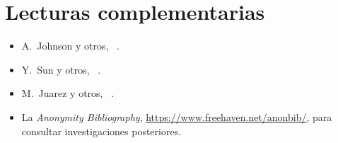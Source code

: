 \section*{Lecturas complementarias}
\begin{itemize}
  \item A.~Johnson y otros, ~\cite{johnson2013users}.
  \item Y.~Sun y otros, ~\cite{sun2015raptor}.
  \item M.~Juarez y otros, ~\cite{juarez2014critical}.
  \item La \emph{Anonymity Bibliography}, \url{https://www.freehaven.net/anonbib/}, para consultar investigaciones posteriores.
\end{itemize}
